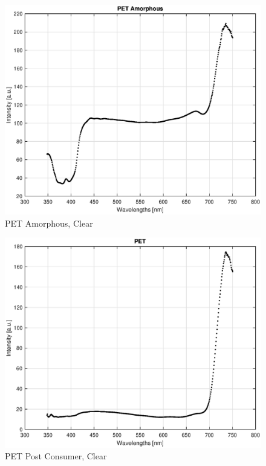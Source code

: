 \begin{appendices}
\begin{figure}
    \centering
    \includegraphics[width = 12cm]{Images/appendix/pet-amorphous-pristine-clear.eps}
    \caption[$\; \:$PET Amorphous]{PET Amorphous, Clear}
\end{figure}

\begin{figure}
    \centering
    \includegraphics[width = 12cm]{Images/appendix/pet-postconsum.eps}
    \caption[$\; \:$PET Post Consumer]{PET Post Consumer, Clear}
\end{figure}


\end{appendices}
